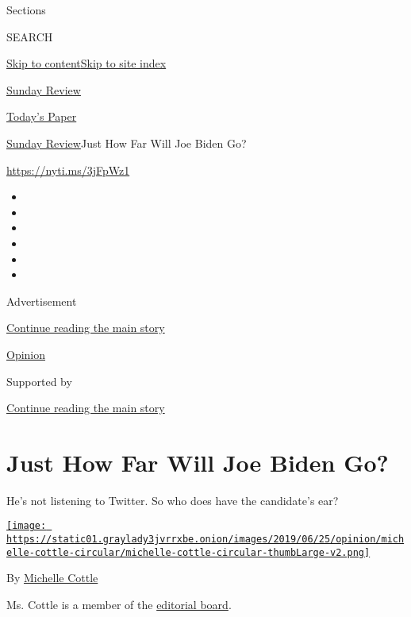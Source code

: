 Sections

SEARCH

\protect\hyperlink{site-content}{Skip to
content}\protect\hyperlink{site-index}{Skip to site index}

\href{https://www.nytimes3xbfgragh.onion/section/opinion/sunday}{Sunday
Review}

\href{https://myaccount.nytimes3xbfgragh.onion/auth/login?response_type=cookie\&client_id=vi}{}

\href{https://www.nytimes3xbfgragh.onion/section/todayspaper}{Today's
Paper}

\href{/section/opinion/sunday}{Sunday Review}\textbar{}Just How Far Will
Joe Biden Go?

\url{https://nyti.ms/3jFpWz1}

\begin{itemize}
\item
\item
\item
\item
\item
\item
\end{itemize}

Advertisement

\protect\hyperlink{after-top}{Continue reading the main story}

\href{/section/opinion}{Opinion}

Supported by

\protect\hyperlink{after-sponsor}{Continue reading the main story}

\hypertarget{just-how-far-will-joe-biden-go}{%
\section{Just How Far Will Joe Biden
Go?}\label{just-how-far-will-joe-biden-go}}

He's not listening to Twitter. So who does have the candidate's ear?

\href{https://www.nytimes3xbfgragh.onion/by/michelle-cottle}{\texttt{[image: https://static01.graylady3jvrrxbe.onion/images/2019/06/25/opinion/michelle-cottle-circular/michelle-cottle-circular-thumbLarge-v2.png]}}

By \href{https://www.nytimes3xbfgragh.onion/by/michelle-cottle}{Michelle
Cottle}

Ms. Cottle is a member of the
\href{https://www.nytimes3xbfgragh.onion/interactive/2018/opinion/editorialboard.html}{editorial
board}.

